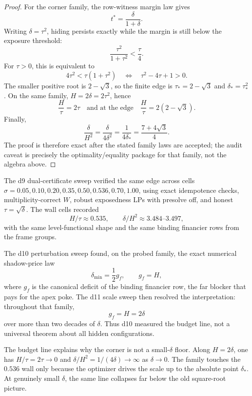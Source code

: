 \begin{proof}
For the corner family, the row-witness margin law gives
\[
  t^*=\frac{\delta}{1+\delta}.
\]
Writing \(\delta=\tau^2\), hiding persists exactly while the margin is still
below the exposure threshold:
\[
  \frac{\tau^2}{1+\tau^2}<\frac{\tau}{4}.
\]
For \(\tau>0\), this is equivalent to
\[
  4\tau^2<\tau(1+\tau^2)
  \quad\Longleftrightarrow\quad
  \tau^2-4\tau+1>0.
\]
The smaller positive root is \(2-\sqrt 3\), so the finite edge is
\(\tau_* = 2-\sqrt 3\) and \(\delta_*=\tau_*^2\).  On the same family,
\(H=2\delta=2\tau^2\), hence
\[
  \frac{H}{\tau}=2\tau
  \quad\text{and at the edge}\quad
  \frac{H}{\tau}=2(2-\sqrt 3).
\]
Finally,
\[
  \frac{\delta}{H^2}
    =\frac{\delta}{4\delta^2}
    =\frac{1}{4\delta_*}
    =\frac{7+4\sqrt 3}{4}.
\]
The proof is therefore exact after the stated family laws are accepted; the
audit caveat is precisely the optimality/equality package for that family, not
the algebra above.
\end{proof}

\begin{numericalresult}
\numbadge
The d9 dual-certificate sweep verified the same edge across cells
\(\sigma=0.05,0.10,0.20,0.35,0.50,0.536,0.70,1.00\), using exact idempotence
checks, multiplicity-correct \(W\), robust exposedness LPs with presolve off,
and honest \(\tau=\sqrt\delta\).  The wall cells recorded
\[
  H/\tau \approx 0.535,\qquad \delta/H^2\approx 3.484\text{--}3.497,
\]
with the same level-functional shape and the same binding financier rows from
the frame groups.

The d10 perturbation sweep found, on the probed family, the exact numerical
shadow-price law
\[
  \delta_{\min}=\frac12 g_f,\qquad g_f=H,
\]
where \(g_f\) is the canonical deficit of the binding financier row, the far
blocker that pays for the apex poke.  The d11 scale sweep then resolved the
interpretation: throughout that family,
\[
  g_f=H=2\delta
\]
over more than two decades of \(\delta\).  Thus d10 measured the budget line,
not a universal theorem about all hidden configurations.
\end{numericalresult}

The budget line explains why the corner is not a small-\(\delta\) floor.  Along
\(H=2\delta\), one has \(H/\tau=2\tau\to0\) and
\(\delta/H^2=1/(4\delta)\to\infty\) as \(\delta\to0\).
The family touches the \(0.536\) wall only because the optimizer drives the
scale up to the absolute point \(\delta_*\).  At genuinely small \(\delta\), the
same line collapses far below the old square-root picture.

